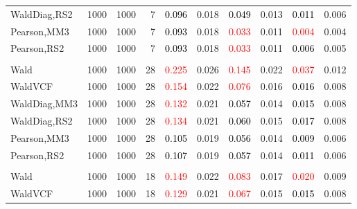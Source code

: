 \documentclass[
]{article}
\begin{document}
\begin{table}[H]
{\begin{tabular}[t]{lrrrrrrlrr}
\hspace{1em}WaldDiag,RS2 & 1000 & 1000 & 7 & \textcolor{black}{0.096} & 0.018 & \textcolor{black}{0.049} & 0.013 & \textcolor{black}{0.011} & 0.006\\
\hspace{1em}Pearson,MM3 & 1000 & 1000 & 7 & \textcolor{black}{0.093} & 0.018 & \textcolor{red}{0.033} & 0.011 & \textcolor{red}{0.004} & 0.004\\
\hspace{1em}Pearson,RS2 & 1000 & 1000 & 7 & \textcolor{black}{0.093} & 0.018 & \textcolor{red}{0.033} & 0.011 & \textcolor{black}{0.006} & 0.005\\
\addlinespace[0.3em]
\multicolumn{10}{l}{\textbf{1F 15V}}\\
\hspace{1em}Wald & 1000 & 1000 & 28 & \textcolor{red}{0.225} & 0.026 & \textcolor{red}{0.145} & 0.022 & \textcolor{red}{0.037} & 0.012\\
\hspace{1em}WaldVCF & 1000 & 1000 & 28 & \textcolor{red}{0.154} & 0.022 & \textcolor{red}{0.076} & 0.016 & \textcolor{black}{0.016} & 0.008\\
\hspace{1em}WaldDiag,MM3 & 1000 & 1000 & 28 & \textcolor{red}{0.132} & 0.021 & \textcolor{black}{0.057} & 0.014 & \textcolor{black}{0.015} & 0.008\\
\hspace{1em}WaldDiag,RS2 & 1000 & 1000 & 28 & \textcolor{red}{0.134} & 0.021 & \textcolor{black}{0.060} & 0.015 & \textcolor{black}{0.017} & 0.008\\
\hspace{1em}Pearson,MM3 & 1000 & 1000 & 28 & \textcolor{black}{0.105} & 0.019 & \textcolor{black}{0.056} & 0.014 & \textcolor{black}{0.009} & 0.006\\
\hspace{1em}Pearson,RS2 & 1000 & 1000 & 28 & \textcolor{black}{0.107} & 0.019 & \textcolor{black}{0.057} & 0.014 & \textcolor{black}{0.011} & 0.006\\
\addlinespace[0.3em]
\multicolumn{10}{l}{\textbf{2F 10V}}\\
\hspace{1em}Wald & 1000 & 1000 & 18 & \textcolor{red}{0.149} & 0.022 & \textcolor{red}{0.083} & 0.017 & \textcolor{red}{0.020} & 0.009\\
\hspace{1em}WaldVCF & 1000 & 1000 & 18 & \textcolor{red}{0.129} & 0.021 & \textcolor{red}{0.067} & 0.015 & \textcolor{black}{0.015} & 0.008\\

\end{tabular}}
\end{table}
\end{document}
